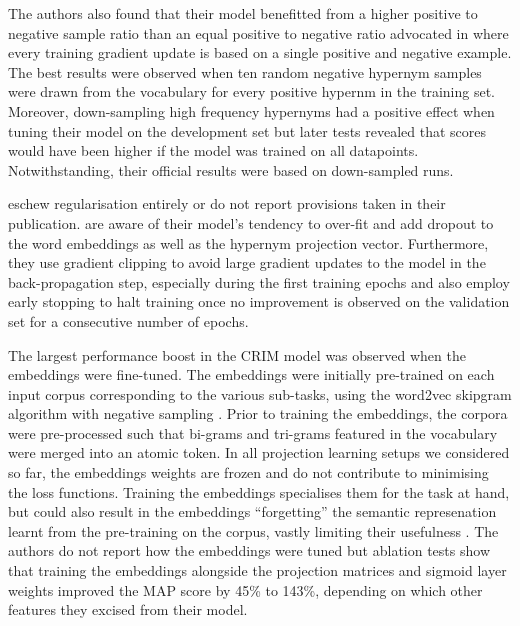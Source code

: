 The authors also found that their model benefitted from a higher positive to negative sample ratio than an equal positive to negative ratio advocated in \citep{yamane2016distributional} where every training gradient update is based on a single positive and negative example.  The best results were observed when ten random negative hypernym samples were drawn from the vocabulary for every positive hypernm in the training set.  Moreover, down-sampling high frequency hypernyms had a positive effect when tuning their model on the development set but later tests revealed that scores would have been higher if the model was trained on all datapoints.  Notwithstanding, their official results were based on down-sampled runs.

\citep{yamane2016distributional} eschew regularisation entirely or do not report provisions taken in their publication.  \citeauthor{bernier2018crim} are aware of their model’s tendency to over-fit and add dropout to the word embeddings as well as the hypernym projection vector.  Furthermore, they use gradient clipping to avoid large gradient updates to the model in the back-propagation step, especially during the first training epochs and also employ early stopping to halt training once no improvement is observed on the validation set for a consecutive number of epochs.

The largest performance boost in the CRIM model was observed when the embeddings were fine-tuned.  The embeddings were initially pre-trained on each input corpus corresponding to the various sub-tasks, using the word2vec skipgram algorithm with negative sampling \citep{mikolov2013efficient}.  Prior to training the embeddings, the corpora were pre-processed such that bi-grams and tri-grams featured in the vocabulary were merged into an atomic token.  In all projection learning setups we considered so far, the embeddings weights are frozen and do not contribute to minimising the loss functions.  Training the embeddings specialises them for the task at hand, but could also result in the embeddings “forgetting” the semantic represenation learnt from the pre-training on the corpus, vastly limiting their usefulness \citep{howard2018universal}.  The authors do not report how the embeddings were tuned but ablation tests show that training the embeddings alongside the projection matrices and sigmoid layer weights improved the \ac{MAP} score by 45\% to 143\%, depending on which other features they excised from their model.

